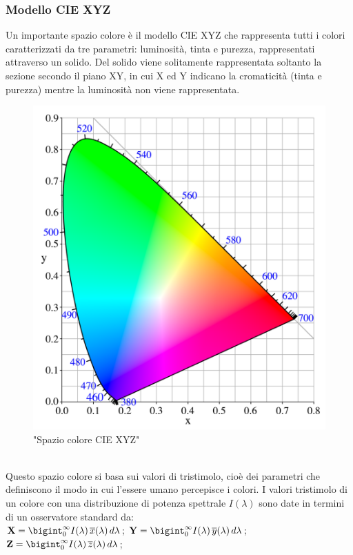 \documentclass[a4paper,11pt]{article}
\begin{document}
        \subsubsection{Modello CIE XYZ}
        Un importante spazio colore è il modello CIE XYZ che rappresenta tutti i colori caratterizzati da tre parametri: luminosità, tinta e purezza, rappresentati attraverso un solido. 
        Del solido viene solitamente rappresentata soltanto la sezione secondo il piano XY, in cui X ed Y indicano la cromaticità (tinta e purezza) mentre la luminosità non viene rappresentata.
        \begin{figure}[h]
            \centering
            \includegraphics[scale=0.2]{CIEXYZ.png}
            \caption{"Spazio colore CIE XYZ"}
        \end{figure}
        \\Questo spazio colore si basa sui valori di tristimolo, cioè dei parametri che definiscono il modo in cui l'essere umano percepisce i colori. 
        I valori tristimolo di un colore con una distribuzione di potenza spettrale $I(\lambda)$  sono date in termini di un osservatore standard da:
        \\[0.2in]
            $\textbf{X}=\bigint_0^\infty I(\lambda)\,\overline{x}(\lambda)\,d\lambda$;
            $\textbf{Y}=\bigint_0^\infty I(\lambda)\,\overline{y}(\lambda)\,d\lambda$;
            $\textbf{Z}=\bigint_0^\infty I(\lambda)\,\overline{z}(\lambda)\,d\lambda$;
      
\end{document}
